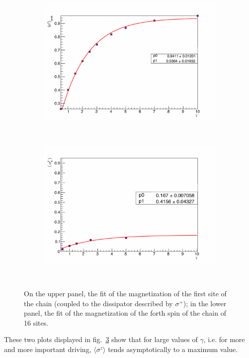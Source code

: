 \begin{figure}[H]
\centering
\begin{subfigure}{\columnwidth}
\centering
    \includegraphics[width=1.\linewidth, height=0.5\linewidth]{Figures/FIT_PeakLMVsGamma.pdf}
    \label{fig:12sites_LMvsGamma}
\end{subfigure}\\
\begin{subfigure}{\columnwidth}
\centering
    \includegraphics[width=1.\linewidth, height=0.5\linewidth]{Figures/FIT_16sites_4thSiteVSgamma.pdf}
    \label{fig:16sites_LMvsGamma}
\end{subfigure}\\
\captionsetup{width=1.\linewidth}
\caption{On the upper panel, the fit of the magnetization of the first site of the chain (coupled to the dissipator described by $\sigma^+$); in the lower panel, the fit of the magnetization of the forth spin of the chain of 16 sites.}
\label{fig:LM_PeakAnd4th_vsGamma2panels}
\end{figure}

These two plots displayed in fig.~\ref{fig:LM_PeakAnd4th_vsGamma2panels} show that for large values of $\gamma$, i.e. for more and more important driving, $\langle\sigma^z\rangle$ tends asymptotically to a maximum value.

